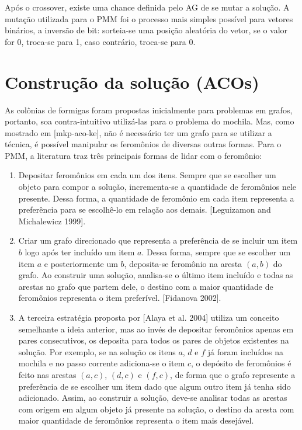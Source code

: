 Após o crossover, existe uma chance definida pelo AG de se mutar a solução. A mutação utilizada para o PMM foi o processo mais simples possível para vetores binários, a inversão de bit: sorteia-se uma posição aleatória do vetor, se o valor for 0, troca-se para 1, caso contrário, troca-se para 0.

\section{Construção da solução (ACOs)}
As colônias de formigas foram propostas inicialmente para problemas em grafos, portanto, soa contra-intuitivo utilizá-las para o problema do mochila. Mas, como mostrado em [mkp-aco-ke], não é necessário ter um grafo para se utilizar a técnica, é possível manipular os feromônios de diversas outras formas. Para o PMM, a literatura traz três principais formas de lidar com o feromônio:

\begin{enumerate} 
	\item Depositar feromônios em cada um dos itens. Sempre que se escolher um objeto para compor a solução, incrementa-se a quantidade de feromônios nele presente. Dessa forma, a quantidade de feromônio em cada item representa a preferência para se escolhê-lo em relação aos demais. [Leguizamon and Michalewicz 1999].
	\item Criar um grafo direcionado que representa a preferência de se incluir um item $b$ logo após ter incluído um item $a$. Dessa forma, sempre que se escolher um item $a$ e posteriormente um $b$, deposita-se feromônio na aresta $(a,b)$ do grafo. Ao construir uma solução, analisa-se o último item incluído e todas as arestas no grafo que partem dele, o destino com a maior quantidade de feromônios representa o item preferível. [Fidanova 2002].
	\item A terceira estratégia proposta por [Alaya et al. 2004] utiliza um conceito semelhante a ideia anterior, mas ao invés de depositar feromônios apenas em pares consecutivos, os deposita para todos os pares de objetos existentes na solução. Por exemplo, se na solução os itens $a$, $d$ e $f$ já foram incluídos na mochila e no passo corrente adiciona-se o item $c$, o depósito de feromônios é feito nas arestas $(a,c)$, $(d,c)$ e $(f,c)$, de forma que o grafo represente a preferência de se escolher um item dado que algum outro item já tenha sido adicionado. Assim, ao construir a solução, deve-se analisar todas as arestas com origem em algum objeto já presente na solução, o destino da aresta com maior quantidade de feromônios representa o item mais desejável.
\end{enumerate}

